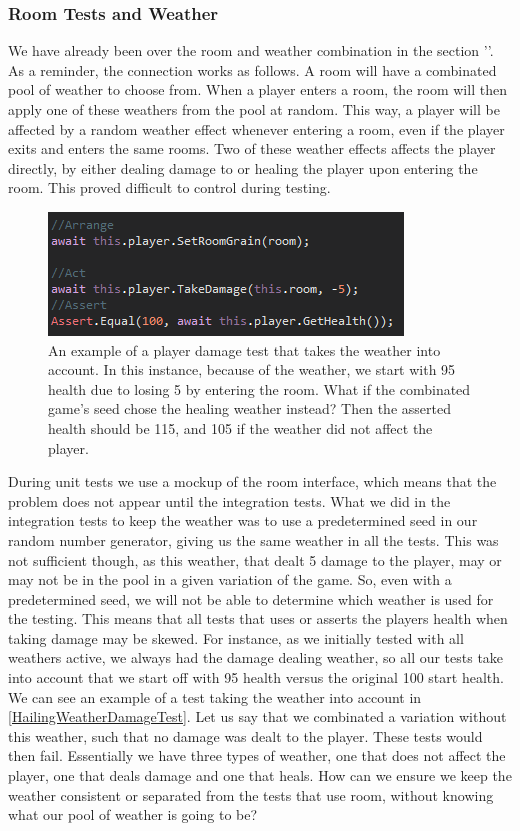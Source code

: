 \subsubsection{Room Tests and Weather}
We have already been over the room and weather combination in the section ''. As a reminder, the connection works as follows. A room will have a combinated pool of weather to choose from. When a player enters a room, the room will then apply one of these weathers from the pool at random. This way, a player will be affected by a random weather effect whenever entering a room, even if the player exits and enters the same rooms. Two of these weather effects affects the player directly, by either dealing damage to or healing the player upon entering the room. This proved difficult to control during testing. \\
\begin{figure}[h]
    \centering
    \includegraphics[width=0.5\linewidth]{Materials/TestingDiscussion/HailingWeatherDamageTest}
    \caption{An example of a player damage test that takes the weather into account. In this instance, because of the weather, we start with 95 health due to losing 5 by entering the room. What if the combinated game's seed chose the healing weather instead? Then the asserted health should be 115, and 105 if the weather did not affect the player.}
    \label{HailingWeatherDamageTest}
\end{figure}
During unit tests we use a mockup of the room interface, which means that the problem does not appear until the integration tests. What we did in the integration tests to keep the weather was to use a predetermined seed in our random number generator, giving us the same weather in all the tests. This was not sufficient though, as this weather, that dealt 5 damage to the player, may or may not be in the pool in a given variation of the game. So, even with a predetermined seed, we will not be able to determine which weather is used for the testing. This means that all tests that uses or asserts the players health when taking damage may be skewed. For instance, as we initially tested with all weathers active, we always had the damage dealing weather, so all our tests take into account that we start off with 95 health versus the original 100 start health. We can see an example of a test taking the weather into account in \autoref{HailingWeatherDamageTest}. Let us say that we combinated a variation without this weather, such that no damage was dealt to the player. These tests would then fail. Essentially we have three types of weather, one that does not affect the player, one that deals damage and one that heals. How can we ensure we keep the weather consistent or separated from the tests that use room, without knowing what our pool of weather is going to be?  \\
